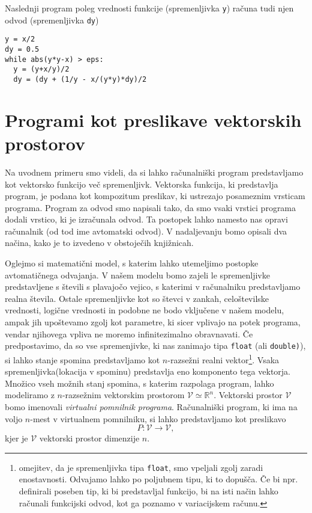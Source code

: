 \documentclass{article}
\newcommand{\RR}{\mathbb{R}}
\newcommand{\VV}{\mathcal{V}}
\begin{document}
Naslednji program poleg vrednosti funkcije (spremenljivka \texttt{y}) računa
tudi njen odvod (spremenljivka \texttt{dy})
\begin{verbatim}
y = x/2
dy = 0.5
while abs(y*y-x) > eps:
  y = (y+x/y)/2
  dy = (dy + (1/y - x/(y*y)*dy)/2
\end{verbatim}

\section{Programi kot preslikave vektorskih prostorov}
Na uvodnem primeru smo videli, da si lahko računalniški program predstavljamo
kot vektorsko funkcijo več spremenljivk. Vektorska funkcija, ki predstavlja
program, je podana kot kompozitum preslikav, ki ustrezajo posameznim vrsticam
programa. Program za odvod smo napisali tako, da smo vsaki vrstici
programa dodali vrstico, ki je izračunala odvod. Ta postopek lahko namesto nas
opravi računalnik (od tod ime avtomatski odvod). V nadaljevanju bomo opisali dva
načina, kako je to izvedeno v obstoječih knjižnicah. 

Oglejmo si matematični model, s katerim lahko utemeljimo postopke avtomatičnega
odvajanja. V našem modelu bomo zajeli le spremenljivke predstavljene s števili s
plavajočo vejico,  s katerimi v računalniku predstavljamo realna števila. 
Ostale spremenljivke kot so števci v zankah, celoštevilske vrednosti, logične
vrednosti in podobne ne bodo vključene v našem modelu, ampak jih upoštevamo
zgolj kot parametre, ki sicer vplivajo na potek programa, vendar njihovega
vpliva ne moremo infinitezimalno obravnavati. Če predpostavimo, da so vse
spremenjivke, ki nas zanimajo tipa \texttt{float} (ali \texttt{double)}), si lahko stanje spomina
predstavljamo kot $n$-razsežni realni vektor\footnote[1]{omejitev, da je
  spremenljivka tipa \texttt{float}, smo vpeljali zgolj zaradi enostavnosti.
  Odvajamo lahko po poljubnem tipu, ki to dopušča. Če bi npr. definirali
  poseben tip, ki bi predstavljal funkcijo, bi na isti način lahko računali
  funkcijski odvod, kot ga poznamo v variacijskem računu.}. Vsaka spremenljivka(lokacija v
spominu) predstavlja eno komponento tega vektorja. Množico vseh možnih stanj
spomina, s katerim razpolaga program, lahko modeliramo z $n$-razsežnim
vektorskim prostorom $\VV\simeq\RR^n$. Vektorski prostor $\VV$ bomo imenovali
\emph{virtualni pomnilnik programa}. Računalniški program, ki
ima na voljo $n$-mest v virtualnem pomnilniku, si lahko predstavljamo kot preslikavo
\begin{equation}
  \label{eq:program_kot_preslikava}
  P: \VV\to \VV,
\end{equation}
kjer je $\VV$ vektorski prostor dimenzije $n$.
\end{document}
